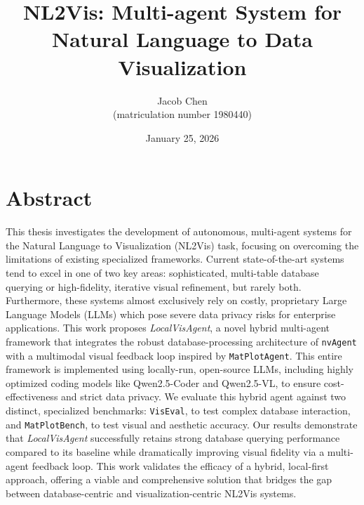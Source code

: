 \documentclass[a4paper,oneside,bibliography=totoc]{scrbook}
\begin{document}
\frontmatter \subject{Master Thesis} %
\title{NL2Vis: Multi-agent System for Natural Language to Data Visualization}
\author{Jacob Chen\\
 (matriculation number 1980440)} \date{January 25, 2026}
\publishers{{\small Submitted to}\\
 Social Data Science Group\\
 Prof.\ Dr.\ Marc Ratkovic\\
 University of Mannheim\\}
\maketitle

\chapter{Abstract}

This thesis investigates the development of autonomous, multi-agent systems for the Natural Language to Visualization (NL2Vis) task, focusing on overcoming the limitations of existing specialized frameworks. Current state-of-the-art systems tend to excel in one of two key areas: sophisticated, multi-table database querying or high-fidelity, iterative visual refinement, but rarely both. Furthermore, these systems almost exclusively rely on costly, proprietary Large Language Models (LLMs) which pose severe data privacy risks for enterprise applications. This work proposes \emph{LocalVisAgent}, a novel hybrid multi-agent framework that integrates the robust database-processing architecture of \texttt{nvAgent} with a multimodal visual feedback loop inspired by \texttt{MatPlotAgent}. This entire framework is implemented using locally-run, open-source LLMs, including highly optimized coding models like Qwen2.5-Coder and Qwen2.5-VL, to ensure cost-effectiveness and strict data privacy. We evaluate this hybrid agent against two distinct, specialized benchmarks: \texttt{VisEval}, to test complex database interaction, and \texttt{MatPlotBench}, to test visual and aesthetic accuracy. Our results demonstrate that \emph{LocalVisAgent} successfully retains strong database querying performance compared to its baseline while dramatically improving visual fidelity via a multi-agent feedback loop. This work validates the efficacy of a hybrid, local-first approach, offering a viable and comprehensive solution that bridges the gap between database-centric and visualization-centric NL2Vis systems.
\end{document}
